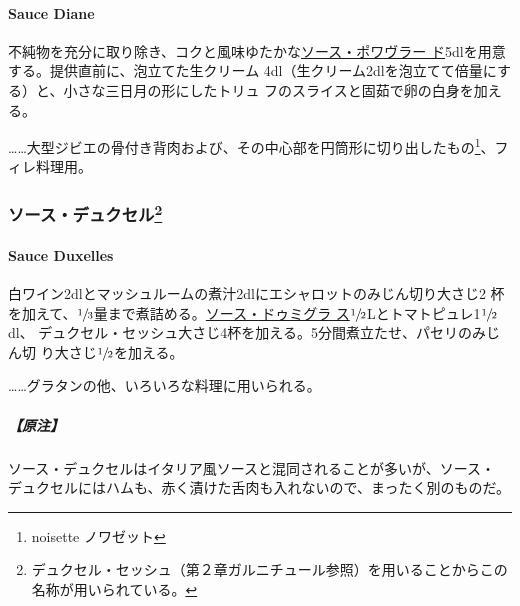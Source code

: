 \documentclass[twoside,12Q,b5j]{escoffierltjsbook}
\renewcommand{\ldots}{…}
\newenvironment{recette}{\begin{small}\begin{spacing}{1}\begin{multicols}{2}}{\end{multicols}\end{spacing}\end{small}}
\begin{document}
\begin{recette}
\paragraph{Sauce Diane}\label{sauce-diane}

 

不純物を充分に取り除き、コクと風味ゆたかな\protect\hyperlink{sauce-poivrade}{ソース・ポワヴラー
ド}5dlを用意する。提供直前に、泡立てた生クリーム
4dl（生クリーム2dlを泡立てて倍量にする）と、小さな三日月の形にしたトリュ
フのスライスと固茹で卵の白身を加える。

\ldots{}\ldots{}大型ジビエの骨付き背肉および、その中心部を円筒形に切り出したもの\footnote{noisette
  ノワゼット}、フィレ料理用。

\vspace*{1.7\zw}

\subsubsection[ソース・デュクセル]{\texorpdfstring{ソース・デュクセル\footnote{デュクセル・セッシュ（第２章ガルニチュール参照）を用いることからこの名称が用いられている。}}{ソース・デュクセル}}\label{ux30bdux30fcux30b9ux30c7ux30e5ux30afux30bbux30eb29}

\hypertarget{sauce-duxelles}{\paragraph{Sauce
Duxelles}\label{sauce-duxelles}}


白ワイン2dlとマッシュルームの煮汁2dlにエシャロットのみじん切り大さじ2
杯を加えて、\(\sfrac{1}{3}\)量まで煮詰める。\protect\hyperlink{sauce-demi-glace}{ソース・ドゥミグラ
ス}\(\sfrac{1}{2}\)Lとトマトピュレ1\(\sfrac{1}{2}\)dl、
デュクセル・セッシュ大さじ4杯を加える。5分間煮立たせ、パセリのみじん切
り大さじ\(\sfrac{1}{2}\)を加える。

\ldots{}\ldots{}グラタンの他、いろいろな料理に用いられる。

\subparagraph{【原注】}\label{ux539fux6ce8}

ソース・デュクセルはイタリア風ソースと混同されることが多いが、ソース・
デュクセルにはハムも、赤く漬けた舌肉も入れないので、まったく別のものだ。


\end{recette}
\end{document}
